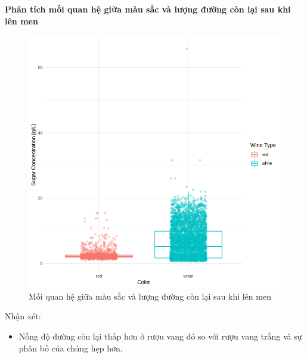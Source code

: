 \textbf{Phân tích mối quan hệ giữa màu sắc và lượng đường còn lại sau khi lên men}
\begin{figure}[H]
    \centering
    \includegraphics[width=0.75\columnwidth]{wine_colors/wine_color_sugar.png}
    \caption{Mối quan hệ giữa màu sắc và lượng đường còn lại sau khi lên men}
    \label{fig:wine_color_sugar}
\end{figure}
Nhận xét:
\begin{itemize}
    \item Nồng độ đường còn lại thấp hơn ở rượu vang đỏ so với rượu vang trắng và sự phân bố của chúng hẹp hơn.
\end{itemize}

